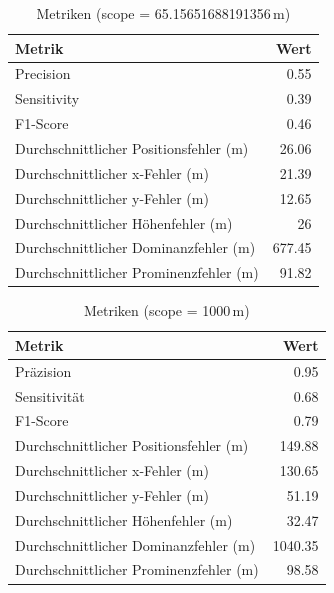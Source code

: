 \begin{table}[htbp]
\centering
\caption{Metriken (scope = 65.15651688191356\,m)}
\label{tab:metrics_65m_square}
\begin{tabular}{|l|r|}
\hline
Metrik & Wert \\
\hline
Precision & 0.55 \\
\hline
Sensitivity & 0.39 \\
\hline
F1-Score & 0.46 \\
\hline
Durchschnittlicher Positionsfehler (m) & 26.06 \\
\hline
Durchschnittlicher x-Fehler (m) & 21.39 \\
\hline
Durchschnittlicher y-Fehler (m) & 12.65 \\
\hline
Durchschnittlicher Höhenfehler (m) & 26 \\
\hline
Durchschnittlicher Dominanzfehler (m) & 677.45 \\
\hline
Durchschnittlicher Prominenzfehler (m) & 91.82 \\
\hline
\end{tabular}
\end{table}

\begin{table}[htbp]
\centering
\caption{Metriken (scope = 1000\,m)}
\label{tab:metrics_1000m_circular}
\begin{tabular}{|l|r|}
\hline
Metrik & Wert \\
\hline
Präzision & 0.95 \\
\hline
Sensitivität & 0.68 \\
\hline
F1-Score & 0.79 \\
\hline
Durchschnittlicher Positionsfehler (m) & 149.88 \\
\hline
Durchschnittlicher x-Fehler (m) & 130.65 \\
\hline
Durchschnittlicher y-Fehler (m) & 51.19 \\
\hline
Durchschnittlicher Höhenfehler (m) & 32.47 \\
\hline
Durchschnittlicher Dominanzfehler (m) & 1040.35 \\
\hline
Durchschnittlicher Prominenzfehler (m) & 98.58 \\
\hline
\end{tabular}
\end{table}


